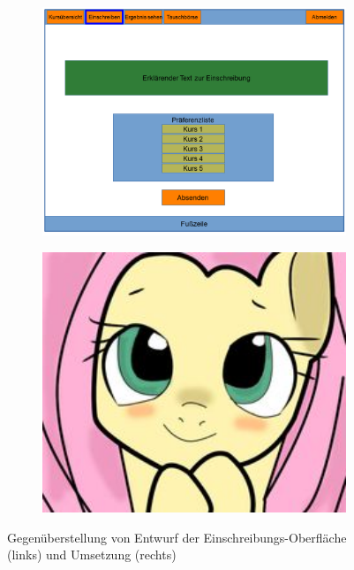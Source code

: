         \begin{figure}
            \centering
            \begin{subfigure}{0.49\textwidth}
                \includegraphics[width=1.0\textwidth]{./implementation/images/MockUpsFrontend/frontendPreferences.png}
            \end{subfigure}
            \begin{subfigure}{0.49\textwidth}
                \includegraphics[width=1.0\textwidth]{./implementation/images/dummy.jpg}
            \end{subfigure}
            \caption{Gegenüberstellung von Entwurf der Einschreibungs-Oberfläche (links) und Umsetzung (rechts)}
            \label{fig:comparisonPrefenrences}
        \end{figure}
    
